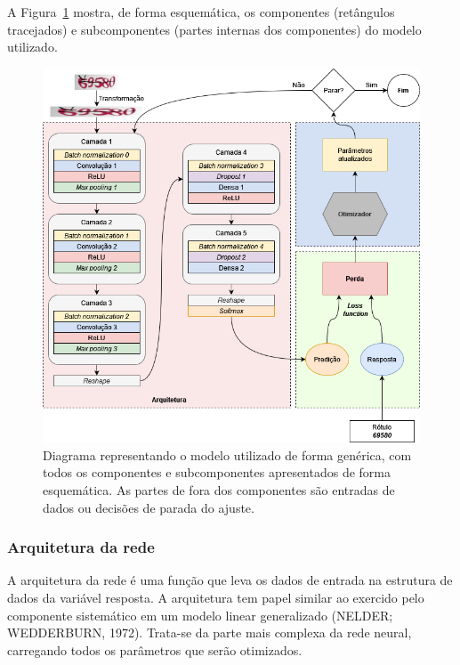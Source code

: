 \documentclass[12pt,twoside,brazilian]{book}
\begin{document}
A Figura~\ref{fig-diagrama-modelo-cnn} mostra, de forma esquemática, os
componentes (retângulos tracejados) e subcomponentes (partes internas
dos componentes) do modelo utilizado.

\begin{figure}

{\centering \includegraphics{./assets/img/diagrama-modelo-cnn.png}

}

\caption{\label{fig-diagrama-modelo-cnn}Diagrama representando o modelo
utilizado de forma genérica, com todos os componentes e subcomponentes
apresentados de forma esquemática. As partes de fora dos componentes são
entradas de dados ou decisões de parada do ajuste.}

\end{figure}

\hypertarget{arquitetura-da-rede}{%
\subsubsection{Arquitetura da rede}\label{arquitetura-da-rede}}

A arquitetura da rede é uma função que leva os dados de entrada na
estrutura de dados da variável resposta. A arquitetura tem papel similar
ao exercido pelo componente sistemático em um modelo linear generalizado
(NELDER; WEDDERBURN, 1972). Trata-se da parte mais complexa da rede
neural, carregando todos os parâmetros que serão otimizados.
\end{document}
